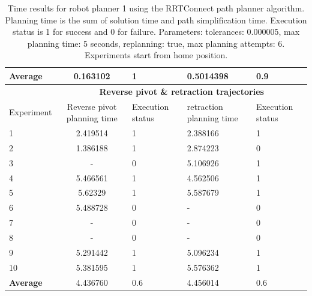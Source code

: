 \begin{table}[H]
\begin{tabular}{|p{2cm}|c|p{2cm}|p{2cm}|p{2cm}|}
\hline
\textbf{Average} & 	0.163102 & 1	& 0.5014398 &	0.9 \\
\hline
                          & \multicolumn{4}{c}{\textbf{Reverse pivot \& retraction trajectories}}                     \vline \\
\hline
Experiment                & Reverse pivot planning time & Execution status & retraction planning time & Execution status  \\
\hline
1 & 2.419514	& 1	& 2.388166	& 1 \\
2 & 1.386188	& 1	& 2.874223	& 0 \\
3 & -	& 0	& 5.106926	& 1 \\
4 & 5.466561	& 1	& 4.562506	& 1 \\
5 & 5.62329	& 1	& 5.587679	& 1 \\
6 & 5.488728	& 0	& -	& 0 \\
7 & -	& 0	& -	& 0 \\
8 & -	& 0	& -	& 0 \\
9 & 5.291442	& 1	& 5.096234	& 1 \\
10 & 5.381595	& 1	& 5.576362	& 1 \\
\hline
\textbf{Average} & 	4.436760	& 0.6	& 4.456014	& 0.6 \\
\hline
\end{tabular}
\caption{Time results for robot planner 1 using the RRTConnect path planner algorithm. Planning time is the sum of solution time and path simplification time. Execution status is 
1 for success and 0 for failure. Parameters: tolerances: 0.000005, max planning time: 5 seconds, replanning: true, max planning attempts: 6. Experiments start from home position.}
\label{robot-planner1-rrtconnect-data}
\end{table}


